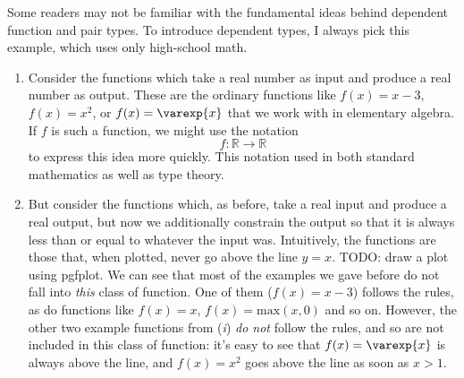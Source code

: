 \documentclass[11pt]{article} %
\theoremstyle{definition}
\theoremstyle{remark}
\newenvironment{aside}
  {\begin{mdframed}[style=0,%
      leftline=false,rightline=false,leftmargin=2em,rightmargin=2em,%
          innerleftmargin=0pt,innerrightmargin=0pt,linewidth=0.75pt,%
      skipabove=7pt,skipbelow=7pt]\small}
  {\end{mdframed}}
\begin{document}
\begin{aside}
Some readers may not be familiar with the fundamental ideas behind dependent function and pair types.
To introduce dependent types, I always pick this example, which uses only high-school math.
\begin{enumerate}[label=\textit{\roman*})]
\item
  Consider the functions which take a real number as input and produce a real number as output.
  These are the ordinary functions like $f(x) = x - 3$, $f(x) = x^2$, or $f(x) = \varexp{x}$ that we work with in elementary algebra.
  If $f$ is such a function, we might use the notation $$f : \mathbb R \to \mathbb R$$ to express this idea more quickly.
  This notation used in both standard mathematics as well as type theory.
\item
  But consider the functions which, as before, take a real input and produce a real output, but now we additionally constrain the output so that it is always less than or equal to whatever the input was.
  Intuitively, the functions are those that, when plotted, never go above the line $y = x$.
  TODO: draw a plot using pgfplot.
  We can see that most of the examples we gave before do not fall into \emph{this} class of function.
  One of them ($f(x) = x - 3$) follows the rules, as do functions like $f(x) = x$, $f(x) = \mathrm{max}(x, 0)$ and so on.
  However, the other two example functions from (\textit{i}) \emph{do not} follow the rules, and so are not included in this class of function:
    it's easy to see that $f(x) = \varexp{x}$ is always above the line, and $f(x) = x^2$ goes above the line as soon as $x > 1$.


\end{enumerate}
\end{aside}
\end{document}
